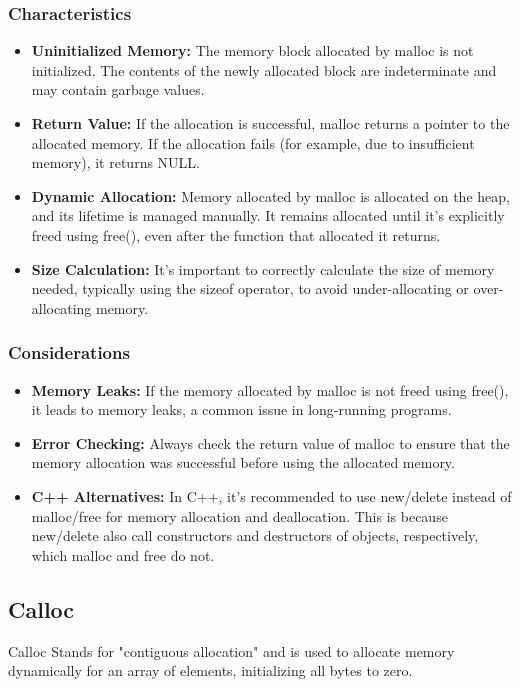 \documentclass{report}
\begin{document}
\begin{concept}
    \subsubsection{Characteristics}
    \bigbreak \noindent 
    \begin{itemize}
        \item \textbf{Uninitialized Memory:} The memory block allocated by malloc is not initialized. The contents of the newly allocated block are indeterminate and may contain garbage values.
        \item \textbf{Return Value:} If the allocation is successful, malloc returns a pointer to the allocated memory. If the allocation fails (for example, due to insufficient memory), it returns NULL.
        \item \textbf{Dynamic Allocation:} Memory allocated by malloc is allocated on the heap, and its lifetime is managed manually. It remains allocated until it's explicitly freed using free(), even after the function that allocated it returns.
        \item \textbf{Size Calculation:} It's important to correctly calculate the size of memory needed, typically using the sizeof operator, to avoid under-allocating or over-allocating memory.
    \end{itemize}
    \bigbreak \noindent 
    \subsubsection{Considerations}
    \begin{itemize}
        \item \textbf{Memory Leaks:} If the memory allocated by malloc is not freed using free(), it leads to memory leaks, a common issue in long-running programs.
        \item \textbf{Error Checking:} Always check the return value of malloc to ensure that the memory allocation was successful before using the allocated memory.
        \item \textbf{C++ Alternatives:} In C++, it's recommended to use new/delete instead of malloc/free for memory allocation and deallocation. This is because new/delete also call constructors and destructors of objects, respectively, which malloc and free do not.
    \end{itemize}

    \pagebreak 
    \subsection{Calloc}
    \bigbreak \noindent 
    \begin{concept}
        Calloc Stands for "contiguous allocation" and is used to allocate memory dynamically for an array of elements, initializing all bytes to zero.
    \end{concept}
    \bigbreak \noindent 

\end{concept}
\end{document}
